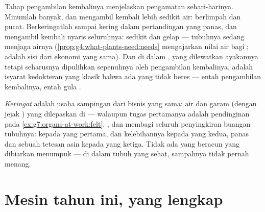 \begin{example}\label{ex:g7:removing-wastes:thrift}
Tahap pengambilan kembalinya menjelaskan pengamatan sehari-harinya.
Minumlah banyak, dan  mengambil kembali lebih sedikit air:
 berlimpah dan pucat. Berkeringatlah sampai kering dalam
pertandingan yang panas, dan  mengambil kembali nyaris
seluruhnya:  sedikit dan gelap --- tubuhnya sedang menjaga
airnya (\cref{prop:g4:what-plants-need:needs} mengajarkan nilai air
bagi ;  adalah sisi  dari ekonomi yang sama). Dan
 di dalam , yang dilewatkan ayakannya tetapi seharusnya
dipulihkan sepenuhnya oleh pengambilan kembalinya, adalah isyarat
kedokteran yang klasik bahwa ada yang tidak beres --- entah pengambilan
kembalinya, entah gula .
\end{example}

\begin{remark}\label{rem:g7:removing-wastes:sweat}
\emph{Keringat} adalah usaha sampingan dari bisnis
yang sama: air dan garam (dengan jejak ) yang dilepaskan di 
--- walaupun tugas pertamanya adalah pendinginan pada
\cref{ex:g7:organs-at-work:felt}. ,  dan  membagi
seluruh penyingkiran buangan tubuhnya:  kepada yang
pertama,  dan kelebihannya kepada yang kedua, panas dan sebuah
tetesan asin kepada yang ketiga. Tidak ada yang beracun yang
dibiarkan menumpuk --- di dalam tubuh yang sehat, sampahnya tidak
pernah menang.
\end{remark}

\section{Mesin tahun ini, yang lengkap}


